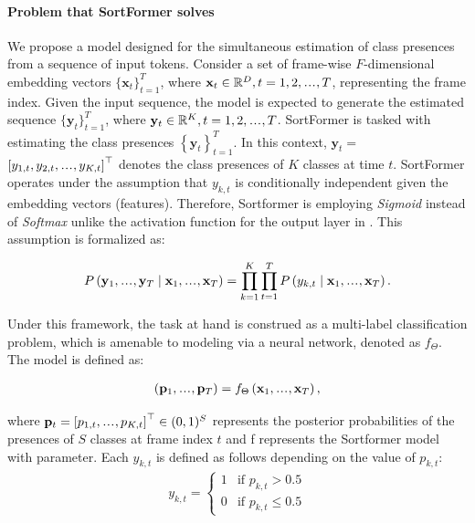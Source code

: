 \documentclass{article}
\newcommand\sdots{\makebox[1em][c]{.\hfil.\hfil.}}
\begin{document}
\paragraph{Problem that SortFormer solves}
We propose a model designed for the simultaneous estimation of class presences from a sequence of input tokens.
Consider a set of frame-wise \( F \)-dimensional embedding vectors
$ \{ \mathbf{x}_t \}_{t=1}^T $, where $ \mathbf{x}_t \in \mathbb{R}^D, t = 1, 2, \sdots, T $, representing the frame index.
Given the input sequence, the model is expected to generate the estimated sequence $\{ \mathbf{y}_t \}_{t=1}^T$, where $ \mathbf{y}_t \in \mathbb{R}^K, t = 1, 2, \sdots, T $.
SortFormer is tasked with estimating the class presences \( \left\{\mathbf{y}_t\right\}_{t=1}^T \). In this context, $\mathbf{y}_t =$ {\small $\left[y_{1, t}, y_{2, t}, \sdots, y_{K, t}\right]^{\top}$}
denotes the class presences of \( K \) classes at time \( t \). SortFormer operates under the assumption that $ y_{k, t} $ is conditionally independent given the embedding vectors (features).
Therefore, Sortformer is employing \textit{Sigmoid} instead of \textit{Softmax} unlike the activation function for the output layer in \cite{vaswani2017attention,radford2019language}.
This assumption is formalized as:

\begin{align}
  P\left(\mathbf{y}_1, \sdots, \mathbf{y}_T \mid \mathbf{x}_1, \sdots, \mathbf{x}_T\right) = \prod_{k=1}^K\prod_{t=1}^T  P\left(y_{k, t} \mid \mathbf{x}_1, \sdots, \mathbf{x}_T\right).
\end{align}

Under this framework, the task at hand is construed as a multi-label classification problem, which is amenable to modeling via a neural network, denoted as  $f_{\Theta}$. The model is defined as:

\begin{align}
  \left(\mathbf{p}_1, \sdots, \mathbf{p}_T\right) = f_{\Theta}\left(\mathbf{x}_1, \sdots, \mathbf{x}_T\right),
\end{align}

where \( \mathbf{p}_t = \left[p_{1, t}, \sdots, p_{K, t}\right]^{\top} \in (0,1)^S \) represents the posterior probabilities of the presences of \( S \) classes at frame index \( t \) and f represents
the Sortformer model with parameter.
Each \( y_{k, t} \) is defined as follows depending on the value of \( p_{k, t} \):
\begin{align}
  y_{k,t} =
  \begin{cases}
    1 & \text{if } p_{k,t} > 0.5    \\
    0 & \text{if } p_{k,t} \leq 0.5
  \end{cases}
\end{align}
\end{document}
